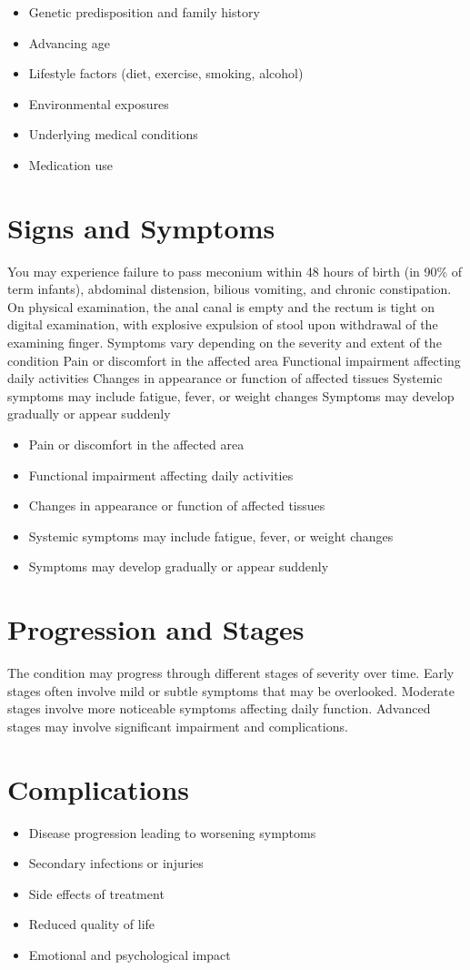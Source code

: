 \begin{itemize}[noitemsep]
  \item Genetic predisposition and family history
  \item Advancing age
  \item Lifestyle factors (diet, exercise, smoking, alcohol)
  \item Environmental exposures
  \item Underlying medical conditions
  \item Medication use
\end{itemize}
\section{Signs and Symptoms}
You may experience failure to pass meconium within 48 hours of birth (in 90\% of term infants), abdominal distension, bilious vomiting, and chronic constipation. On physical examination, the anal canal is empty and the rectum is tight on digital examination, with explosive expulsion of stool upon withdrawal of the examining finger. Symptoms vary depending on the severity and extent of the condition Pain or discomfort in the affected area Functional impairment affecting daily activities Changes in appearance or function of affected tissues Systemic symptoms may include fatigue, fever, or weight changes Symptoms may develop gradually or appear suddenly

\begin{itemize}[noitemsep]
  \item Pain or discomfort in the affected area
  \item Functional impairment affecting daily activities
  \item Changes in appearance or function of affected tissues
  \item Systemic symptoms may include fatigue, fever, or weight changes
  \item Symptoms may develop gradually or appear suddenly
\end{itemize}
\section{Progression and Stages}
The condition may progress through different stages of severity over time. Early stages often involve mild or subtle symptoms that may be overlooked. Moderate stages involve more noticeable symptoms affecting daily function. Advanced stages may involve significant impairment and complications.
\section{Complications}
\begin{itemize}[noitemsep]
  \item Disease progression leading to worsening symptoms
  \item Secondary infections or injuries
  \item Side effects of treatment
  \item Reduced quality of life
  \item Emotional and psychological impact
\end{itemize}
